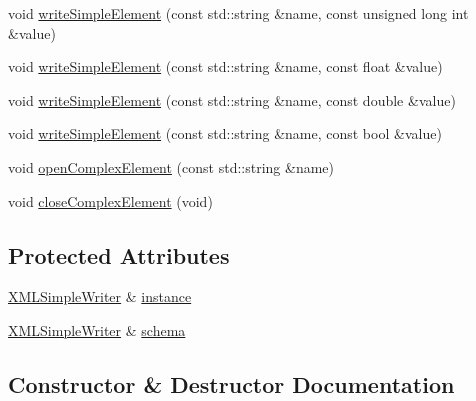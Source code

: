\begin{DoxyCompactItemize}
\item 
void \mbox{\hyperlink{classXMLWriterAPI_1_1XMLSimpleSchemaWriter_a1c74f3c8d41ca4e660f119580de9202e}{write\+Simple\+Element}} (const std\+::string \&name, const unsigned long int \&value)
\item 
void \mbox{\hyperlink{classXMLWriterAPI_1_1XMLSimpleSchemaWriter_aea7726895cd925dac93eaad7c339a898}{write\+Simple\+Element}} (const std\+::string \&name, const float \&value)
\item 
void \mbox{\hyperlink{classXMLWriterAPI_1_1XMLSimpleSchemaWriter_adca0f83d1ac6848cdd95ad8b82ebcc1c}{write\+Simple\+Element}} (const std\+::string \&name, const double \&value)
\item 
void \mbox{\hyperlink{classXMLWriterAPI_1_1XMLSimpleSchemaWriter_aecd8faa2f1b2411dc108007c05bdb339}{write\+Simple\+Element}} (const std\+::string \&name, const bool \&value)
\item 
void \mbox{\hyperlink{classXMLWriterAPI_1_1XMLSimpleSchemaWriter_a136a57c1860b0baa0fd6b877f4dce4bc}{open\+Complex\+Element}} (const std\+::string \&name)
\item 
void \mbox{\hyperlink{classXMLWriterAPI_1_1XMLSimpleSchemaWriter_a48be6d4cbc08f03e9e76fa94107c4b8a}{close\+Complex\+Element}} (void)
\end{DoxyCompactItemize}
\subsection*{Protected Attributes}
\begin{DoxyCompactItemize}
\item 
\mbox{\hyperlink{classXMLWriterAPI_1_1XMLSimpleWriter}{X\+M\+L\+Simple\+Writer}} \& \mbox{\hyperlink{classXMLWriterAPI_1_1XMLSimpleSchemaWriter_acad25faff4c5f64554d85a075e232b19}{instance}}
\item 
\mbox{\hyperlink{classXMLWriterAPI_1_1XMLSimpleWriter}{X\+M\+L\+Simple\+Writer}} \& \mbox{\hyperlink{classXMLWriterAPI_1_1XMLSimpleSchemaWriter_a97a86e85c4750599a68ab4a318c2d11d}{schema}}
\end{DoxyCompactItemize}


\subsection{Constructor \& Destructor Documentation}
\mbox{\label{classXMLWriterAPI_1_1XMLSimpleSchemaWriter_a309425b6927188991ba8fb9d19e0caca}} 
